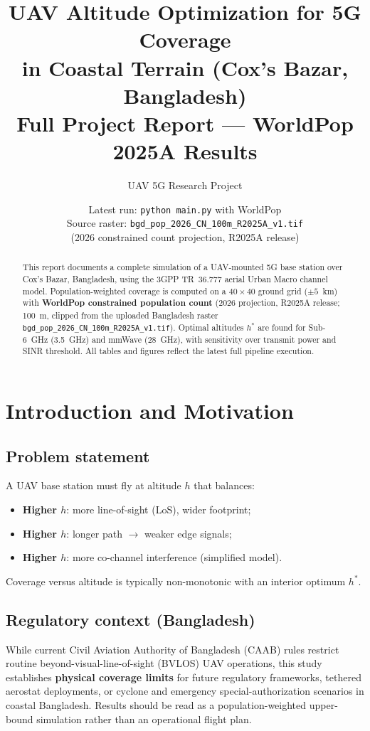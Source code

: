 \documentclass[11pt,a4paper]{article}
\title{\textbf{UAV Altitude Optimization for 5G Coverage}\\
\large in Coastal Terrain (Cox's Bazar, Bangladesh)\\
\large Full Project Report --- WorldPop 2025A Results}
\author{UAV 5G Research Project}
\date{Latest run: \texttt{python main.py} with WorldPop \\
Source raster: \texttt{bgd\_pop\_2026\_CN\_100m\_R2025A\_v1.tif}\\
(2026 constrained count projection, R2025A release)}
\begin{document}
\maketitle

\begin{abstract}
This report documents a complete simulation of a UAV-mounted 5G base station
over Cox's Bazar, Bangladesh, using the 3GPP TR~36.777 aerial Urban Macro channel
model. Population-weighted coverage is computed on a $40\times40$ ground grid
($\pm 5$~km) with \textbf{WorldPop constrained population count} (2026 projection,
R2025A release; 100~m, clipped from the uploaded Bangladesh raster
\texttt{bgd\_pop\_2026\_CN\_100m\_R2025A\_v1.tif}).
Optimal altitudes $h^\ast$ are found for Sub-6~GHz (3.5~GHz) and mmWave (28~GHz),
with sensitivity over transmit power and SINR threshold. All tables and figures
reflect the latest full pipeline execution.
\end{abstract}

\tableofcontents
\newpage

\section{Introduction and Motivation}

\subsection{Problem statement}
A UAV base station must fly at altitude $h$ that balances:
\begin{itemize}[noitemsep]
  \item \textbf{Higher $h$}: more line-of-sight (LoS), wider footprint;
  \item \textbf{Higher $h$}: longer path $\rightarrow$ weaker edge signals;
  \item \textbf{Higher $h$}: more co-channel interference (simplified model).
\end{itemize}
Coverage versus altitude is typically non-monotonic with an interior optimum $h^\ast$.

\subsection{Regulatory context (Bangladesh)}
While current Civil Aviation Authority of Bangladesh (CAAB) rules restrict routine
beyond-visual-line-of-sight (BVLOS) UAV operations, this study establishes
\textbf{physical coverage limits} for future regulatory frameworks, tethered
aerostat deployments, or cyclone and emergency special-authorization scenarios
in coastal Bangladesh. Results should be read as a population-weighted
upper-bound simulation rather than an operational flight plan.
\end{document}
